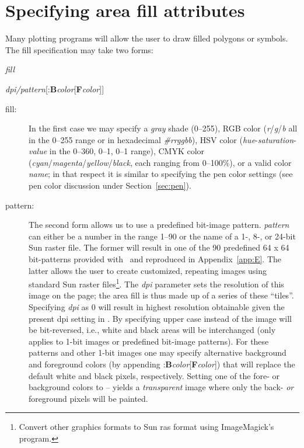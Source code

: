 \section{Specifying area fill attributes}

%
%
%
%
%
%
%
\label{sec:fill}

Many plotting programs will allow the user to draw filled polygons or
symbols.  The fill specification may take two forms: 

\vspace{\baselineskip} 

\par {}\emph{fill}\par 

\par {}\emph{dpi/pattern}[:\textbf{B}\emph{color}[\textbf{F}\emph{color}]]\par 

\vspace{\baselineskip} 
\noindent
\begin{description}
\item [fill:]
In the first case we may specify a \emph{gray} shade (0--255), RGB color
(\emph{r}/\emph{g}/\emph{b} all in the 0--255 range or in hexadecimal \emph{\#rrggbb}), HSV color (\emph{hue}-\emph{saturation}-\emph{value}
in the 0--360, 0--1, 0--1 range), CMYK color (\emph{cyan}/\emph{magenta}/\emph{yellow}/\emph{black},
each ranging from 0--100\%), or a valid color \emph{name}; in that respect it is similar
to specifying the pen color settings (see pen color discussion under Section~\ref{sec:pen}).
\item [pattern:]
The second form allows us to use a predefined bit-image pattern.
\emph{pattern} can either be a number in the range 1--90 or the name of a 1-,
8-, or 24-bit Sun raster file.  The former will result in one of the 90
predefined 64 x 64 bit-patterns provided with \GMT\ and reproduced in Appendix~\ref{app:E}.
The latter allows the user to create customized, repeating images using
standard Sun raster files\footnote{Convert other graphics formats to Sun ras format using
ImageMagick's  program.}.  The \emph{dpi} parameter sets the resolution of
this image on the page;  the area fill is thus made up of a series of these
``tiles''.  Specifying \emph{dpi} as 0 will result in highest resolution
obtainable given the present dpi setting in .
By specifying upper case  instead of  the image will be
bit-reversed, i.e., white and black areas will be interchanged (only applies
to 1-bit images or predefined bit-image patterns).  For these patterns and
other 1-bit images one may specify alternative background and foreground
colors (by appending :\textbf{B}\emph{color}[\textbf{F}\emph{color}]) that will
replace the default white and black pixels, respectively.  Setting one of the
fore- or background colors to -- yields a \emph{transparent} image where only the
back- \emph{or} foreground pixels will be painted.
\end{description}

